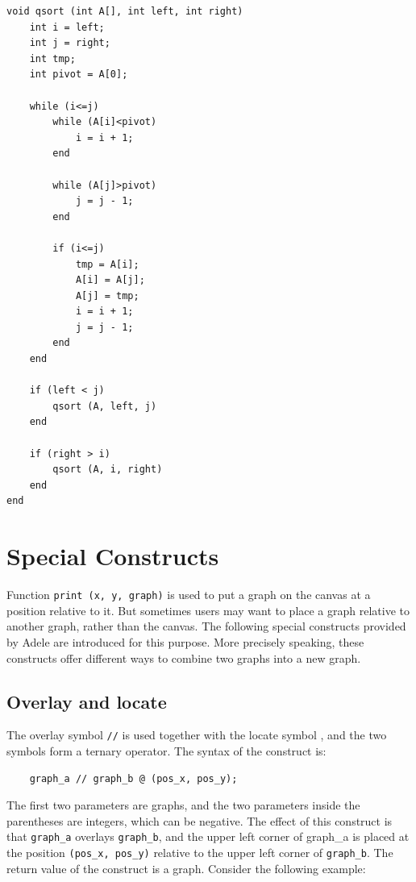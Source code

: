 \documentclass[11pt,letterpaper]{article}
\begin{document}
\begin{lstlisting}[caption=qsort.adele, label=qsort, captionpos=b, frame=single, tabsize=4]
void qsort (int A[], int left, int right)
	int i = left;
	int j = right;
	int tmp;
	int pivot = A[0];

	while (i<=j)
		while (A[i]<pivot)
			i = i + 1;
		end
  		
		while (A[j]>pivot)
			j = j - 1;
		end
  		
  		if (i<=j)
			tmp = A[i];
			A[i] = A[j];
			A[j] = tmp;
			i = i + 1;
			j = j - 1;
		end
	end

	if (left < j)
  		qsort (A, left, j)
	end

	if (right > i)
  		qsort (A, i, right)
	end
end
\end{lstlisting}


\section {Special Constructs}

Function \texttt{print (x, y, graph)} is used to put a graph on the canvas at a position relative to it. But sometimes users may want to place a graph relative to another graph, rather than the canvas. The following special constructs provided by Adele are introduced for this purpose. More precisely speaking, these constructs offer different ways to combine two graphs into a new graph.

\subsection {Overlay and locate}

The overlay symbol \texttt{//} is used together with the locate symbol \texttt{\@}, and the two symbols form a ternary operator. The syntax of the construct is:

\begin{lstlisting}
    graph_a // graph_b @ (pos_x, pos_y);
\end{lstlisting}

The first two parameters are graphs, and the two parameters inside the parentheses are integers, which can be negative. The effect of this construct is that \texttt{graph\_a} overlays \texttt{graph\_b}, and the upper left corner of graph\_a is placed at the position \texttt{(pos\_x, pos\_y)} relative to the upper left corner of \texttt{graph\_b}. The return value of the construct is a graph. Consider the following example:
\end{document}
